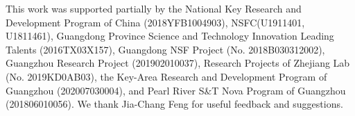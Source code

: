 \documentclass[sigconf]{acmart}
\begin{document}
This work was supported partially by the National Key Research and Development Program of China (2018YFB1004903), NSFC(U1911401, U1811461), Guangdong Province Science and Technology Innovation Leading Talents (2016TX03X157), Guangdong NSF Project (No. 2018B030312002), Guangzhou Research Project (201902010037), Research Projects of Zhejiang Lab (No. 2019KD0AB03), the Key-Area Research and Development Program of Guangzhou (202007030004), and Pearl River S\&T Nova Program of Guangzhou (201806010056).
We thank Jia-Chang Feng for useful feedback and suggestions.




\end{document}
